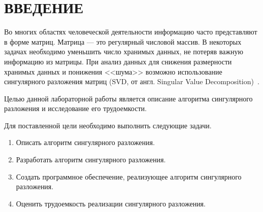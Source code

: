 \chapter*{\hfill{\centering  ВВЕДЕНИЕ}\hfill}


Во многих областях человеческой деятельности информацию часто представляют в форме матриц.
Матрица --- это регулярный числовой массив. В некоторых задачах необходимо уменьшить 
число хранимых данных, не потеряв важную информацию из матрицы. При анализ данных для снижения размерности хранимых данных и понижения <<шума>> возможно использование сингулярного разложения матриц (SVD, от англ. Singular Value Decomposition)~\cite{SVD}.


Целью данной лабораторной работы является описание алгоритма сингулярного разложения и исследование его трудоемкости.

\label{sec:targets}
Для поставленной цели необходимо выполнить следующие задачи.
\begin{enumerate}
	\item Описать алгоритм сингулярного разложения.
	\item Разработать алгоритм сингулярного разложения.
	\item Создать программное обеспечение, реализующее алгоритм сингулярного разложения.
	\item Оценить трудоемкость реализации сингулярного разложения.
\end{enumerate}




